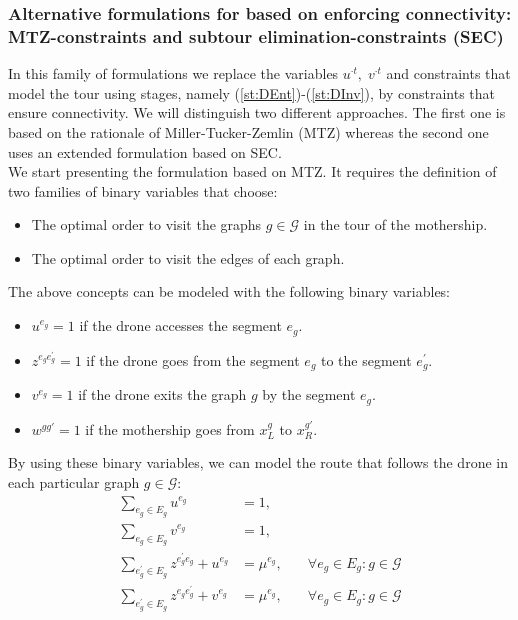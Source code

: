 \subsubsection{Alternative formulations for \AMD\xspace based on enforcing connectivity: MTZ-constraints and subtour elimination-constraints (SEC)\label{sec:AMDMTZ}}
\noindent
In this family of formulations we replace the variables $u^{\cdot t},\; v^{\cdot t}$ and constraints that model the tour using stages, namely (\ref{st:DEnt})-(\ref{st:DInv}), by constraints that ensure connectivity. We will distinguish two different approaches. The first one is based on the rationale of Miller-Tucker-Zemlin (MTZ) whereas the second one uses an extended formulation based on SEC.\\
\noindent
We start presenting the formulation based on MTZ. It requires the definition of two families of binary variables that choose:
\begin{itemize}
    \item The optimal order to visit the  graphs $g\in\mathcal G$ in the tour of the mothership.
    \item The optimal order to visit the edges of each graph.
\end{itemize}
\noindent
The above concepts can be modeled with the following binary variables:
\begin{itemize}
    \item $u^{e_g} = 1$ if the drone accesses the segment $e_g$.
    \item $z^{e_ge^\prime_g} = 1$ if the drone goes from the segment $e_g$ to the segment $e^\prime_g$.
    \item $v^{e_g} = 1$ if the drone exits the graph  $g$ by the segment $e_g$.
    \item $w^{gg'} = 1$ if the mothership goes from $x_L^g$ to $x_R^{g'}$.
\end{itemize}
\noindent
By using these binary variables, we can model the route that follows the drone in each particular graph $g\in \mathcal G$:
\begin{align}
    \sum_{e_g\in E_g} u^{e_g} & = 1, \label{DEnt2}\\%
    \sum_{e_g\in E_g} v^{e_g} & = 1, \label{DExt}\\%
    \sum_{e^\prime_g\in E_g} z^{e^\prime_ge_g} + u^{e_g} & = \mu^{e_g}, &\quad\forall e_g\in E_g:g\in\mathcal G \label{DInu}\\
    \sum_{e^\prime_g\in E_g} z^{e_ge^\prime_g} + v^{e_g} & = \mu^{e_g}, &\quad\forall e_g\in E_g:g\in\mathcal G \label{DInv2}
\end{align}
